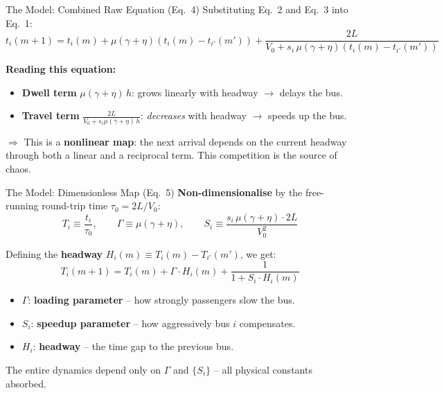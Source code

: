 \documentclass[t, aspectratio=169]{beamer}
\begin{document}
\begin{frame}{The Model: Combined Raw Equation (Eq.~4)}
	Substituting Eq.~2 and Eq.~3 into Eq.~1:
	\begin{equation}
		t_i(m+1) = t_i(m) + \mu(\gamma+\eta)\!\left(t_i(m)-t_{i'}(m')\right) + \frac{2L}{V_0 + s_i\,\mu(\gamma+\eta)\!\left(t_i(m)-t_{i'}(m')\right)}
		\tag{Eq.\,4}
	\end{equation}

	\vspace{0.5em}
	\textbf{Reading this equation:}
	\begin{itemize}
		\item \textbf{Dwell term} $\mu(\gamma+\eta)\,h$: grows linearly with headway $\to$ delays the bus.
		\item \textbf{Travel term} $\frac{2L}{V_0 + s_i\mu(\gamma+\eta)\,h}$: \emph{decreases} with headway $\to$ speeds up the bus.
	\end{itemize}

	\vspace{0.3em}
	$\Rightarrow$ This is a \textbf{nonlinear map}: the next arrival depends on the current headway through both a linear and a reciprocal term. This competition is the source of chaos.
\end{frame}

\begin{frame}{The Model: Dimensionless Map (Eq.~5)}
	\textbf{Non-dimensionalise} by the free-running round-trip time $\tau_0 = 2L/V_0$:
	\[
		T_i \equiv \frac{t_i}{\tau_0}, \qquad
		\Gamma \equiv \mu(\gamma+\eta), \qquad
		S_i \equiv \frac{s_i\,\mu(\gamma+\eta)\cdot 2L}{V_0^2}
	\]

	\vspace{0.2em}
	Defining the \textbf{headway} $H_i(m) \equiv T_i(m) - T_{i'}(m')$, we get:
	\begin{equation}
		\boxed{\;T_i(m+1) = T_i(m) + \Gamma \cdot H_i(m) + \frac{1}{1 + S_i \cdot H_i(m)}\;}
		\tag{Eq.\,5}
	\end{equation}

	\begin{itemize}
		\item $\Gamma$: \textbf{loading parameter} -- how strongly passengers slow the bus.
		\item $S_i$: \textbf{speedup parameter} -- how aggressively bus $i$ compensates.
		\item $H_i$: \textbf{headway} -- the time gap to the previous bus.
	\end{itemize}

	\vspace{0.2em}
	The entire dynamics depend only on $\Gamma$ and $\{S_i\}$ -- all physical constants absorbed.
\end{frame}
\end{document}
